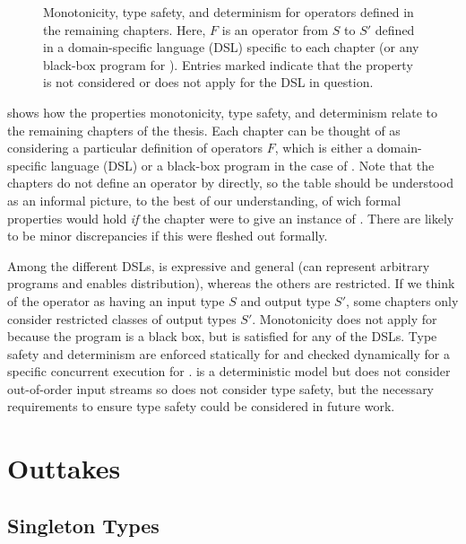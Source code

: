 \begin{figure}[t]
\caption[Monotonicity, type safety, and determinism for the remaining chapters.]{Monotonicity, type safety, and determinism for operators defined in the remaining chapters. Here, $F$ is an operator from $S$ to $S'$ defined in a domain-specific language (DSL) specific to each chapter (or any black-box program for ). Entries marked \NA{} indicate that the property is not considered or does not apply for the DSL in question.}
\label{fig:operator-properties-chapter-table}
\end{figure}

 shows how the properties monotonicity, type safety, and determinism relate to the remaining chapters of the thesis.
Each chapter can be thought of as considering a particular definition of operators $F$, which is either a domain-specific language (DSL) or a black-box program in the case of .
Note that the chapters do not define an operator by  directly, so the table should be understood as an informal picture, to the best of our understanding, of wich formal properties would hold \emph{if} the chapter were to give an instance of . There are likely to be minor discrepancies if this were fleshed out formally.

Among the different DSLs,  is expressive and general (can represent arbitrary programs and enables distribution), whereas the others are restricted.
If we think of the operator as having an input type $S$ and output type $S'$,
some chapters only consider restricted classes of output types $S'$.
Monotonicity does not apply for 
because the program is a black box, but is satisfied for any of the DSLs.
Type safety and determinism are enforced statically for  and checked dynamically for a specific concurrent execution for .
 is a deterministic model but does not consider out-of-order input streams so does not consider type safety, but the necessary
requirements to ensure type safety could be considered in future work.

\section{Outtakes}
\label{sec:types-discussion}

\subsection{Singleton Types}


